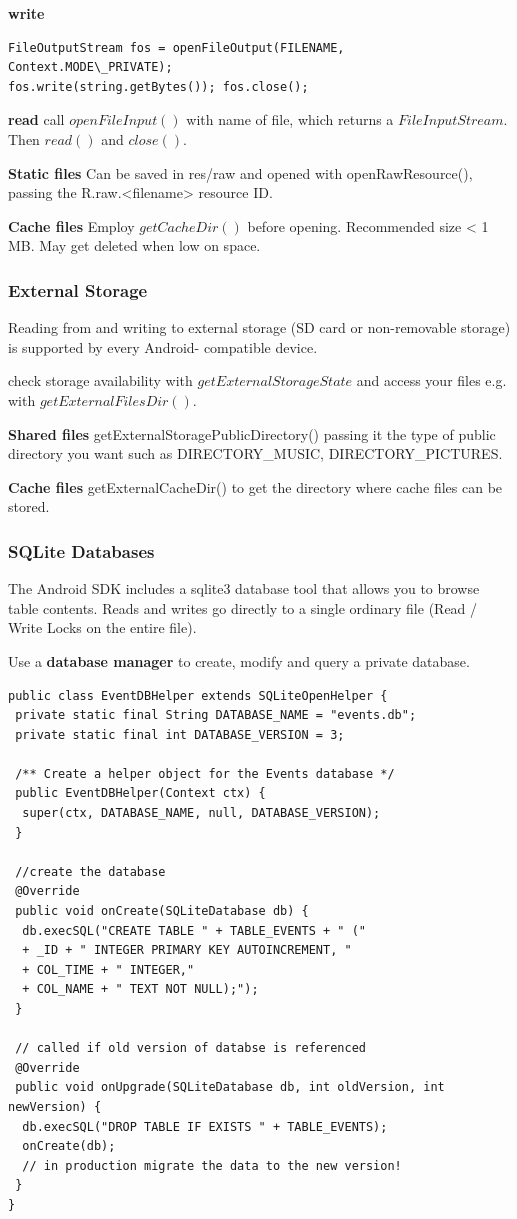 \textbf{write}
\begin{lstlisting}
FileOutputStream fos = openFileOutput(FILENAME, Context.MODE\_PRIVATE);
fos.write(string.getBytes()); fos.close();
\end{lstlisting}

\textbf{read} call $openFileInput()$ with name of file, which returns a
$FileInputStream$. Then $read()$ and $close()$.

\textbf{Static files} Can be saved in res/raw and opened with
openRawResource(), passing the R.raw.<filename> resource ID.

\textbf{Cache files} Employ $getCacheDir()$ before opening. Recommended size <
1 MB. May get deleted when low on space.

\subsubsection{External Storage}
Reading from and writing to external storage (SD card or non-removable storage)
is supported by every Android- compatible device.

check storage availability with $getExternalStorageState$ and access your files
e.g. with $getExternalFilesDir()$.

\textbf{Shared files} getExternalStoragePublicDirectory() passing it the type
of public directory you want such as DIRECTORY\_MUSIC, DIRECTORY\_PICTURES.

\textbf{Cache files} getExternalCacheDir() to get the directory where cache
files can be stored.

\subsubsection{SQLite Databases}
The Android SDK includes a sqlite3 database tool that allows you to browse
table contents. Reads and writes go directly to a single ordinary file (Read /
Write Locks on the entire file).

Use a \textbf{database manager} to create, modify and query a private database.

\begin{lstlisting}
public class EventDBHelper extends SQLiteOpenHelper {
 private static final String DATABASE_NAME = "events.db";
 private static final int DATABASE_VERSION = 3;

 /** Create a helper object for the Events database */
 public EventDBHelper(Context ctx) {
  super(ctx, DATABASE_NAME, null, DATABASE_VERSION);
 }

 //create the database
 @Override
 public void onCreate(SQLiteDatabase db) {
  db.execSQL("CREATE TABLE " + TABLE_EVENTS + " ("
  + _ID + " INTEGER PRIMARY KEY AUTOINCREMENT, "
  + COL_TIME + " INTEGER,"
  + COL_NAME + " TEXT NOT NULL);");
 }

 // called if old version of databse is referenced
 @Override
 public void onUpgrade(SQLiteDatabase db, int oldVersion, int newVersion) {
  db.execSQL("DROP TABLE IF EXISTS " + TABLE_EVENTS);
  onCreate(db);
  // in production migrate the data to the new version!
 }
}
\end{lstlisting}

